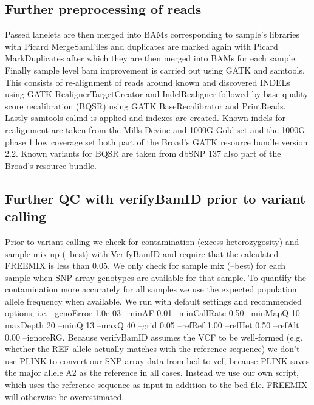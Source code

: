 \subsection{Further preprocessing of reads}
Passed lanelets are then merged into BAMs corresponding to sample’s libraries with Picard MergeSamFiles and duplicates are marked again with Picard MarkDuplicates after which they are then merged into BAMs for each sample.  Finally sample level bam improvement is carried out using GATK\cite{McKenna01092010}\cite{DePristo2011} and samtools\cite{Li15082009}. This consists of re-alignment of reads around known and discovered INDELs using GATK RealignerTargetCreator and IndelRealigner followed by base quality score recalibration (BQSR) using GATK BaseRecalibrator and PrintReads. Lastly samtools calmd is applied and indexes are created. Known indels for realignment are taken from the Mills Devine and 1000G Gold set and the 1000G phase 1 low coverage set both part of the Broad’s GATK resource bundle version 2.2. Known variants for BQSR are taken from dbSNP 137 also part of the Broad’s resource bundle.

\subsection{Further QC with verifyBamID prior to variant calling}

Prior to variant calling we check for contamination (excess heterozygosity) and sample mix up (--best) with VerifyBamID and require that the calculated FREEMIX is less than 0.05. We only check for sample mix (--best) for each sample when SNP array genotypes are available for that sample. To quantify the contamination more accurately for all samples we use the expected population allele frequency when available. We run with default settings and recommended options; i.e. --genoError 1.0e-03 --minAF 0.01 --minCallRate 0.50 --minMapQ 10 --maxDepth 20 --minQ 13 --maxQ 40 --grid 0.05 --refRef 1.00 --refHet 0.50 --refAlt 0.00 --ignoreRG. Because verifyBamID assumes the VCF to be well-formed (e.g. whether the REF allele actually matches with the reference sequence) we don't use PLINK to convert our SNP array data from bed to vcf, because PLINK saves the major allele A2 as the reference in all cases. Instead we use our own script, which uses the reference sequence as input in addition to the bed file. FREEMIX will otherwise be overestimated.
